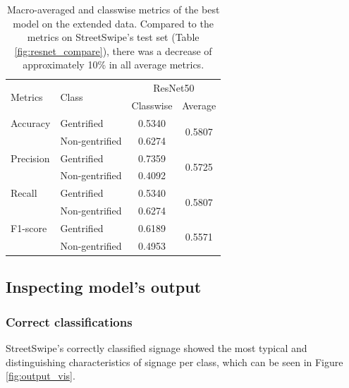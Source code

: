 \begin{table}[h!]
\begin{tabular}{llcc}
\toprule
\multirow{2}{*}{Metrics}   & \multirow{2}{*}{Class} & \multicolumn{2}{c}{ResNet50}   \\ \cline{3-4} 
                           &                        & Classwise & Average                 \\ \hline
Accuracy                   & Gentrified             & 0.5340    & \multirow{2}{*}{0.5807} \\
                           & Non-gentrified         & 0.6274    &                         \\
Precision                  & Gentrified             & 0.7359    & \multirow{2}{*}{0.5725} \\
                           & Non-gentrified         & 0.4092    &                         \\
Recall                     & Gentrified             & 0.5340    & \multirow{2}{*}{0.5807} \\
                           & Non-gentrified         & 0.6274    &                         \\
F1-score                   & Gentrified             & 0.6189    & \multirow{2}{*}{0.5571} \\
                           & Non-gentrified         & 0.4953    &                         \\
\bottomrule
\end{tabular}
\vspace{\baselineskip}
\caption{Macro-averaged and classwise metrics of the best model on the extended data. Compared to the metrics on StreetSwipe's test set (Table \ref{fig:resnet_compare}), there was a decrease of approximately 10\% in all average metrics.}
\label{fig:resnet50_pano}
\vspace{-7mm}
\end{table}

\subsection{Inspecting model's output}
\label{subsec:result4}

\subsubsection{Correct classifications}

StreetSwipe's correctly classified signage showed the most typical and distinguishing characteristics of signage per class, which can be seen in Figure \ref{fig:output_vis}.

